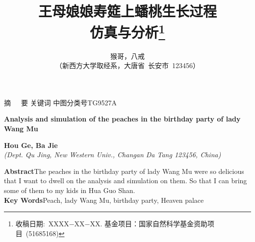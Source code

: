 \documentclass[UTF8,a4paper,11pt,onecolumn,twoside]{ctexart}
\title{\huge{王母娘娘寿筵上蟠桃生长过程\\
		仿真与分析}\thanks{收稿日期:~XXXX$-$XX$-$XX. 基金项目：国家自然科学基金资助项目~(51685168)}}
\author{猴哥，八戒\\[2pt]
	\normalsize
	（新西方大学取经系，大唐省~长安市~123456） \\[2pt]}
\date{}  %
\begin{document}
	
	
\newcommand{\supercite}[1]{\textsuperscript{\cite{#1}}}
	
	

\maketitle


\setlength{\oddsidemargin}{ 1cm}  %
\setlength{\evensidemargin}{\oddsidemargin}
\setlength{\textwidth}{13.50cm}
\vspace{-.8cm}
\begin{center}
	\parbox{\textwidth}{
		{\heiti 摘~~~要}
		{\heiti 关键词}
		{\heiti 中图分类号}\quad TG9527\quad A}
\end{center}
\vspace{.1cm}
\begin{center}
	\parbox{\textwidth}{
		{\large{\textbf{Analysis and simulation of the peaches in the birthday party of lady Wang Mu}}}\\
		\vspace{-0.5cm}
		\begin{center}
			\textbf{Hou Ge, Ba Jie}\\[2pt]
			\small{\textit{(Dept. Qu Jing, New Western Univ., Changan Da Tang 123456, China)}}\\[2pt]
		\end{center}
		{\small{\textbf{Abstract}\quad The peaches in the birthday party of lady Wang Mu were so delicious that I want to dwell on the analysis and simulation on them. So that I can bring some of them to my kids in Hua Guo Shan.\\
				\textbf{Key Words}\quad Peach, lady Wang Mu, birthday party, Heaven palace}}
	}
\end{center}
\end{document}
